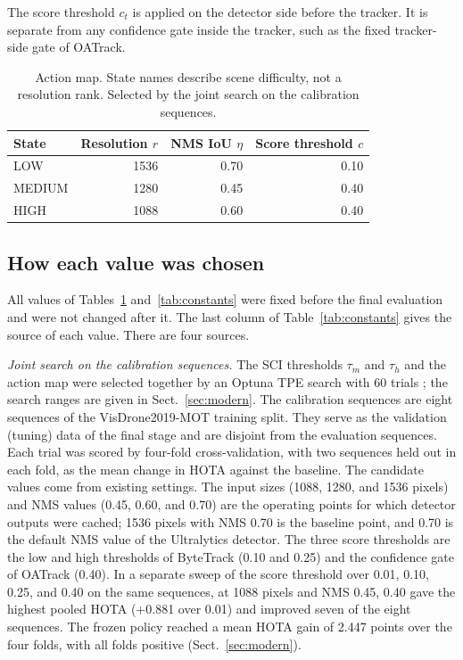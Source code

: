 \documentclass[pdflatex,sn-mathphys-num,iicol]{sn-jnl}
\begin{document}
The score threshold $c_t$ is applied on the detector side before the tracker.
It is separate from any confidence gate inside the tracker, such as the fixed
tracker-side gate of OATrack.

\begin{table}[t]
\caption{Action map. State names describe scene difficulty, not a resolution
rank. Selected by the joint search on the calibration sequences.}
\label{tab:actions}
\centering\footnotesize
\begin{tabular}{@{}lrrr@{}}
\toprule
State & Resolution $r$ & NMS IoU $\eta$ & Score threshold $c$\\
\midrule
LOW & 1536 & 0.70 & 0.10\\
MEDIUM & 1280 & 0.45 & 0.40\\
HIGH & 1088 & 0.60 & 0.40\\
\bottomrule
\end{tabular}
\end{table}

\subsection{How each value was chosen}\label{sec:constants}
All values of Tables~\ref{tab:actions} and~\ref{tab:constants} were fixed
before the final evaluation and were not changed after it. The last column of
Table~\ref{tab:constants} gives the source of each value. There are four
sources.

\emph{Joint search on the calibration sequences.} The SCI thresholds $\tau_m$
and $\tau_h$ and the action map were selected together by an Optuna TPE search
with 60 trials \cite{akiba2019optuna}; the search ranges are given in
Sect.~\ref{sec:modern}. The calibration sequences are eight
sequences of the VisDrone2019-MOT training split. They serve as the validation
(tuning) data of the final stage and are disjoint from the evaluation
sequences. Each trial was scored by four-fold cross-validation, with two
sequences held out in each fold, as the mean change in HOTA against the
baseline. The candidate values come from existing settings. The input sizes
(1088, 1280, and 1536 pixels) and NMS values (0.45, 0.60, and 0.70) are the
operating points for which detector outputs were cached; 1536 pixels
with NMS 0.70 is the baseline point, and 0.70 is the default NMS value of the
Ultralytics detector. The three score thresholds are the low and high
thresholds of ByteTrack (0.10 and 0.25) and the confidence gate of OATrack
(0.40). In a separate sweep of the score threshold over 0.01, 0.10, 0.25, and
0.40 on the same sequences, at 1088 pixels and NMS 0.45, 0.40 gave the highest
pooled HOTA (+0.881 over 0.01) and improved seven of the eight sequences. The frozen policy reached a mean HOTA
gain of 2.447 points over the four folds, with all folds positive
(Sect.~\ref{sec:modern}).
\end{document}
